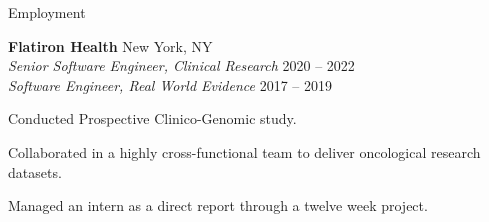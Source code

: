 \documentclass{resume} %
\begin{document}

\begin{grouping}{Employment}

\iffalse
\item {\bf Brown University } \hfill Providence, RI \\
    {\em Research Assistant} \hfill 2023
    \begin{items}
        \item Worked with Peihan Miao on three research projects.
    \end{items}
\fi

\item {\bf Flatiron Health } \hfill New York, NY \\
    {\em Senior Software Engineer, Clinical Research } \hfill 2020 -- 2022 \\
    {\em Software Engineer, Real World Evidence } \hfill 2017 -- 2019
    \begin{items}
        \item Conducted Prospective Clinico-Genomic study.
        \item Collaborated in a highly cross-functional team to deliver oncological research datasets.
        \item Managed an intern as a direct report through a twelve week project.
    \end{items}

\iffalse
\hspace*{3mm}- Conducted Prospective Clinico-Genomic (PCG) study with cross-functional team \\
\hspace*{3mm}- Developed system for sending data quality inquiries to study practices \\
\hspace*{3mm}- Managed an intern as a direct report through a 12 week project
\fi

\iffalse
\hspace*{3mm}- Collaborated in a highly cross-functional team to deliver 11 projects \\
\hspace*{3mm}- Built data pipelines to create oncological research datasets \\
\hspace*{3mm}- Designed and implemented tools to automate team processes
\fi


\end{grouping}
\end{document}
